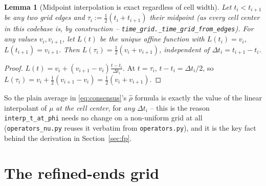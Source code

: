 \documentclass[11pt]{article}
\newtheorem{lemma}{Lemma}
\newcommand{\dt}{\Delta t}
\newcommand{\code}[1]{\texttt{#1}}
\begin{document}
\begin{lemma}[Midpoint interpolation is exact regardless of cell width]
\label{lem:midpoint}
Let $t_i<t_{i+1}$ be any two grid edges and $\tau_i:=\tfrac12(t_i+t_{i+1})$ their
midpoint (as \emph{every} cell center in this codebase is, by construction --
\code{time\_grid.\_time\_grid\_from\_edges}). For any values $v_i,v_{i+1}$, let
$L(t)$ be the unique affine function with $L(t_i)=v_i$, $L(t_{i+1})=v_{i+1}$. Then
$L(\tau_i)=\tfrac12(v_i+v_{i+1})$, independent of $\dt_i=t_{i+1}-t_i$.
\end{lemma}
\begin{proof}
$L(t)=v_i+(v_{i+1}-v_i)\frac{t-t_i}{\dt_i}$. At $t=\tau_i$, $t-t_i=\dt_i/2$, so
$L(\tau_i)=v_i+\tfrac12(v_{i+1}-v_i)=\tfrac12(v_i+v_{i+1})$.
\end{proof}
So the plain average in \eqref{eq:consensus}'s $\hat\rho$ formula is exactly the value
of the linear interpolant of $\mu$ \emph{at the cell center}, for \emph{any} $\dt_i$ --
this is the reason \code{interp\_t\_at\_phi} needs no change on a non-uniform grid at
all (\code{operators\_nu.py} reuses it verbatim from \code{operators.py}), and it is
the key fact behind the derivation in Section~\ref{sec:fp}.

\section{The refined-ends grid}
\end{document}
